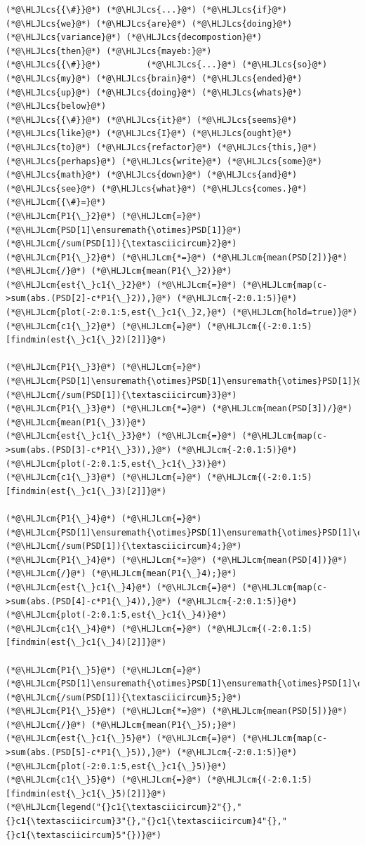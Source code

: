 \documentclass[12pt,a4paper]{article}
\newcommand{\HLJLcm}[1]{\textcolor[RGB]{153,153,119}{\textit{#1}}}
\newcommand{\HLJLcs}[1]{\textcolor[RGB]{153,153,119}{\textit{#1}}}
\begin{document}
\begin{lstlisting}
(*@\HLJLcs{{\#}}@*) (*@\HLJLcs{...}@*) (*@\HLJLcs{if}@*) (*@\HLJLcs{we}@*) (*@\HLJLcs{are}@*) (*@\HLJLcs{doing}@*) (*@\HLJLcs{variance}@*) (*@\HLJLcs{decompostion}@*) (*@\HLJLcs{then}@*) (*@\HLJLcs{mayeb:}@*)
(*@\HLJLcs{{\#}}@*)			(*@\HLJLcs{...}@*) (*@\HLJLcs{so}@*) (*@\HLJLcs{my}@*) (*@\HLJLcs{brain}@*) (*@\HLJLcs{ended}@*) (*@\HLJLcs{up}@*) (*@\HLJLcs{doing}@*) (*@\HLJLcs{whats}@*) (*@\HLJLcs{below}@*)
(*@\HLJLcs{{\#}}@*)	(*@\HLJLcs{it}@*) (*@\HLJLcs{seems}@*) (*@\HLJLcs{like}@*) (*@\HLJLcs{I}@*) (*@\HLJLcs{ought}@*) (*@\HLJLcs{to}@*) (*@\HLJLcs{refactor}@*) (*@\HLJLcs{this,}@*) (*@\HLJLcs{perhaps}@*) (*@\HLJLcs{write}@*) (*@\HLJLcs{some}@*) (*@\HLJLcs{math}@*) (*@\HLJLcs{down}@*) (*@\HLJLcs{and}@*) (*@\HLJLcs{see}@*) (*@\HLJLcs{what}@*) (*@\HLJLcs{comes.}@*)
(*@\HLJLcm{{\#}=}@*)
(*@\HLJLcm{P1{\_}2}@*) (*@\HLJLcm{=}@*) (*@\HLJLcm{PSD[1]\ensuremath{\otimes}PSD[1]}@*) (*@\HLJLcm{/sum(PSD[1]){\textasciicircum}2}@*)
(*@\HLJLcm{P1{\_}2}@*) (*@\HLJLcm{*=}@*) (*@\HLJLcm{mean(PSD[2])}@*) (*@\HLJLcm{/}@*) (*@\HLJLcm{mean(P1{\_}2)}@*)
(*@\HLJLcm{est{\_}c1{\_}2}@*) (*@\HLJLcm{=}@*) (*@\HLJLcm{map(c->sum(abs.(PSD[2]-c*P1{\_}2)),}@*) (*@\HLJLcm{-2:0.1:5)}@*)
(*@\HLJLcm{plot(-2:0.1:5,est{\_}c1{\_}2,}@*) (*@\HLJLcm{hold=true)}@*)
(*@\HLJLcm{c1{\_}2}@*) (*@\HLJLcm{=}@*) (*@\HLJLcm{(-2:0.1:5)[findmin(est{\_}c1{\_}2)[2]]}@*)

(*@\HLJLcm{P1{\_}3}@*) (*@\HLJLcm{=}@*) (*@\HLJLcm{PSD[1]\ensuremath{\otimes}PSD[1]\ensuremath{\otimes}PSD[1]}@*) (*@\HLJLcm{/sum(PSD[1]){\textasciicircum}3}@*)
(*@\HLJLcm{P1{\_}3}@*) (*@\HLJLcm{*=}@*) (*@\HLJLcm{mean(PSD[3])/}@*) (*@\HLJLcm{mean(P1{\_}3)}@*)
(*@\HLJLcm{est{\_}c1{\_}3}@*) (*@\HLJLcm{=}@*) (*@\HLJLcm{map(c->sum(abs.(PSD[3]-c*P1{\_}3)),}@*) (*@\HLJLcm{-2:0.1:5)}@*)
(*@\HLJLcm{plot(-2:0.1:5,est{\_}c1{\_}3)}@*)
(*@\HLJLcm{c1{\_}3}@*) (*@\HLJLcm{=}@*) (*@\HLJLcm{(-2:0.1:5)[findmin(est{\_}c1{\_}3)[2]]}@*)

(*@\HLJLcm{P1{\_}4}@*) (*@\HLJLcm{=}@*) (*@\HLJLcm{PSD[1]\ensuremath{\otimes}PSD[1]\ensuremath{\otimes}PSD[1]\ensuremath{\otimes}PSD[1]}@*) (*@\HLJLcm{/sum(PSD[1]){\textasciicircum}4;}@*)
(*@\HLJLcm{P1{\_}4}@*) (*@\HLJLcm{*=}@*) (*@\HLJLcm{mean(PSD[4])}@*) (*@\HLJLcm{/}@*) (*@\HLJLcm{mean(P1{\_}4);}@*)
(*@\HLJLcm{est{\_}c1{\_}4}@*) (*@\HLJLcm{=}@*) (*@\HLJLcm{map(c->sum(abs.(PSD[4]-c*P1{\_}4)),}@*) (*@\HLJLcm{-2:0.1:5)}@*)
(*@\HLJLcm{plot(-2:0.1:5,est{\_}c1{\_}4)}@*)
(*@\HLJLcm{c1{\_}4}@*) (*@\HLJLcm{=}@*) (*@\HLJLcm{(-2:0.1:5)[findmin(est{\_}c1{\_}4)[2]]}@*)

(*@\HLJLcm{P1{\_}5}@*) (*@\HLJLcm{=}@*) (*@\HLJLcm{PSD[1]\ensuremath{\otimes}PSD[1]\ensuremath{\otimes}PSD[1]\ensuremath{\otimes}PSD[1]\ensuremath{\otimes}PSD[1]}@*) (*@\HLJLcm{/sum(PSD[1]){\textasciicircum}5;}@*)
(*@\HLJLcm{P1{\_}5}@*) (*@\HLJLcm{*=}@*) (*@\HLJLcm{mean(PSD[5])}@*) (*@\HLJLcm{/}@*) (*@\HLJLcm{mean(P1{\_}5);}@*)
(*@\HLJLcm{est{\_}c1{\_}5}@*) (*@\HLJLcm{=}@*) (*@\HLJLcm{map(c->sum(abs.(PSD[5]-c*P1{\_}5)),}@*) (*@\HLJLcm{-2:0.1:5)}@*)
(*@\HLJLcm{plot(-2:0.1:5,est{\_}c1{\_}5)}@*)
(*@\HLJLcm{c1{\_}5}@*) (*@\HLJLcm{=}@*) (*@\HLJLcm{(-2:0.1:5)[findmin(est{\_}c1{\_}5)[2]]}@*)
(*@\HLJLcm{legend("{}c1{\textasciicircum}2"{},"{}c1{\textasciicircum}3"{},"{}c1{\textasciicircum}4"{},"{}c1{\textasciicircum}5"{})}@*)


\end{lstlisting}
\end{document}
